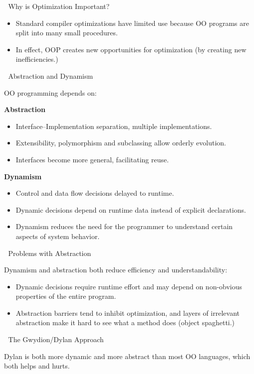 
\newpage
Why is Optimization Important?

\begin{itemize}
\item Standard compiler optimizations have limited use because OO programs are
split into many small procedures.

\item In effect, OOP creates new opportunities for optimization (by creating
new inefficiencies.)
\end{itemize}


\newpage
Abstraction and Dynamism

OO programming depends on:

\vspace{1em}
{\bf Abstraction}
\begin{itemize}
\item Interface--Implementation separation, multiple implementations.
\item Extensibility, polymorphism and subclassing allow orderly evolution.
\item Interfaces become more general, facilitating reuse.
\end{itemize}
{\bf Dynamism}
\begin{itemize}
\item Control and data flow decisions delayed to runtime.
\item Dynamic decisions depend on runtime data instead of explicit
declarations.
\item Dynamism reduces the need for the programmer to understand certain
aspects of system behavior.
\end{itemize}


\newpage
Problems with Abstraction

Dynamism and abstraction both reduce efficiency and understandability:
\begin{itemize}
\item Dynamic decisions require runtime effort and may depend on non-obvious
properties of the entire program.

\item Abstraction barriers tend to inhibit optimization, and layers of
irrelevant abstraction make it hard to see what a method does (object
spaghetti.)  \end{itemize}


\newpage
The Gwydion/Dylan Approach

Dylan is both more dynamic and more abstract than most OO languages, which both
helps and hurts.  

